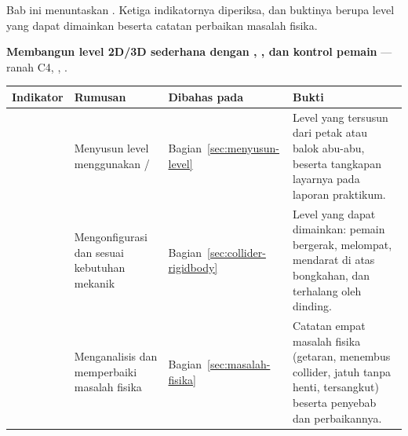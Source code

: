 \begin{subcpmkbox}
Bab ini menuntaskan . Ketiga indikatornya diperiksa, dan buktinya
berupa level yang dapat dimainkan beserta catatan perbaikan masalah fisika.

\vspace{0.5em}
\textbf{ Membangun level 2D/3D sederhana dengan
, , dan kontrol pemain} --- ranah C4,
, .

\vspace{0.5em}
{\setlength{\tabcolsep}{4pt}\footnotesize%
\begin{tabularx}{\textwidth}{@{}C{1.9cm} L{4.0cm} L{2.5cm} Y@{}}
\toprule
\headrow \textbf{Indikator} & \textbf{Rumusan} & \textbf{Dibahas pada} & \textbf{Bukti} \\
\midrule
{} & Menyusun level menggunakan / &
Bagian~\ref{sec:menyusun-level} &
Level yang tersusun dari petak atau balok abu-abu, beserta tangkapan layarnya
pada laporan praktikum. \\
\addlinespace
{} & Mengonfigurasi  dan  sesuai
kebutuhan mekanik &
Bagian~\ref{sec:collider-rigidbody} &
Level yang dapat dimainkan: pemain bergerak, melompat, mendarat di atas
bongkahan, dan terhalang oleh dinding. \\
\addlinespace
{} & Menganalisis dan memperbaiki masalah fisika &
Bagian~\ref{sec:masalah-fisika} &
Catatan empat masalah fisika (getaran, menembus collider, jatuh tanpa henti,
tersangkut) beserta penyebab dan perbaikannya. \\
\bottomrule
\end{tabularx}}
\end{subcpmkbox}

